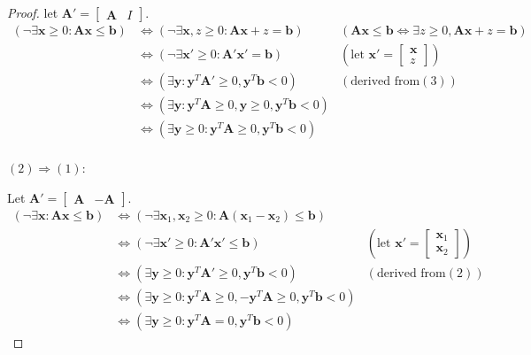 \begin{proof}
        let $\mathbf{A}'=\left[
        \begin{matrix}
            \mathbf{A} & I
        \end{matrix}
        \right]$.
        \begin{align*}
            (\neg \exists \mathbf{x}\ge 0: \mathbf{A}\mathbf{x}\le \mathbf{b})&\iff (\neg \exists \mathbf{x},z\ge 0:\mathbf{A}\mathbf{x}+z=\mathbf{b}) &(\mathbf{A}\mathbf{x}\le \mathbf{b} \iff \exists z\ge 0,\mathbf{A}\mathbf{x}+z=\mathbf{b})\\
                                          &\iff (\neg \exists \mathbf{x}'\ge 0:\mathbf{A}'\mathbf{x}'=\mathbf{b})  &(\text{let }\mathbf{x}'=\left[ \begin{matrix} \mathbf{x} \\ z\end{matrix} \right])\\
                                          &\iff (\exists \mathbf{y} :\mathbf{y}^{T}\mathbf{A}'\ge 0,\mathbf{y}^{T}\mathbf{b}<0) &(\text{derived from} (3)) \\
                                          &\iff (\exists \mathbf{y} :\mathbf{y}^{T}\mathbf{A}\ge 0,\mathbf{y}\ge 0,\mathbf{y}^{T}\mathbf{b}<0) \\
                                          &\iff (\exists \mathbf{y}\ge 0 :\mathbf{y}^{T}\mathbf{A}\ge 0,\mathbf{y}^{T}\mathbf{b}<0) \\
        \end{align*}

        $(2)\Rightarrow(1)$:

        Let $\mathbf{A}'=\left[
        \begin{matrix}
            \mathbf{A} & -\mathbf{A}
        \end{matrix}
        \right]$.
        \begin{align*}
            (\neg \exists \mathbf{x}: \mathbf{A}\mathbf{x}\le \mathbf{b}) &\iff (\neg \exists \mathbf{x}_1,\mathbf{x}_2\ge 0: \mathbf{A}(\mathbf{x}_1-\mathbf{x}_2)\le \mathbf{b}) \\
            &\iff (\neg \exists \mathbf{x}'\ge 0: \mathbf{A}'\mathbf{x}'\le \mathbf{b}) &(\text{let }\mathbf{x}'=\left[ \begin{matrix}\mathbf{x}_1 \\\mathbf{x}_2  \end{matrix} \right])\\
            &\iff (\exists \mathbf{y}\ge 0 :\mathbf{y}^{T}\mathbf{A}'\ge 0,\mathbf{y}^{T}\mathbf{b}<0) &(\text{derived from} (2)) \\
            &\iff (\exists \mathbf{y}\ge 0 :\mathbf{y}^{T}\mathbf{A}\ge 0,-\mathbf{y}^{T}\mathbf{A}\ge 0,\mathbf{y}^{T}\mathbf{b}<0) \\
            &\iff (\exists \mathbf{y}\ge 0 :\mathbf{y}^{T}\mathbf{A}= 0,\mathbf{y}^{T}\mathbf{b}<0)
        \end{align*}
    \end{proof}


